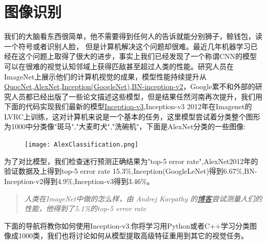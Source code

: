 \section{图像识别}
我们的大脑看东西很简单，他不需要得到任何人的告诉就能分别狮子，鲸钱包，读一个符号或者识别人脸，
但是计算机解决这个问题却很难。最近几年机器学习已经在这个问题上取得了很大的进步，事实上我们已经发现了一个称谓CNN的模型可以在很难的视觉认知邻域上获得匹敌甚至超过人类的性能。研究人员在ImageNet上展示他们的计算机视觉的成果，模型性能持续提升从\href{http://static.googleusercontent.com/media/research.google.com/en//archive/unsupervised_icml2012.pdf}{QuocNet},\href{http://www.cs.toronto.edu/~fritz/absps/imagenet.pdf}{AlexNet},\href{http://arxiv.org/abs/1409.4842}{Inception(GoogleNet)},\href{http://arxiv.org/abs/1502.03167}{BN-inception-v2}，Google累不和外部的研究人员都已经出版了一些论文描述这些模型，但是结果任然河南再次提升，我们用下面的代码实现我们最新的模型\href{http://arxiv.org/abs/1512.00567}{Inception-v3},Inception-v3 2012年在Imagenet的LVRC上训练，这对计算机来说是一个基本的任务，这里模型尝试着分类整个图形为1000中分类像"斑马","大麦町犬","洗碗机"，下面是AlexNet分类的一些图像:
\begin{center}
\begin{figure}[H]
\texttt{[image: AlexClassification.png]}
\end{figure}
\end{center}
为了对比模型，我们检查迷行预测正确结果为"top-5 error rate",AlexNet2012年的验证数据及上得到top-5 error rate 15.3\%,Inception(GoogleLeNet)得到6.67\%,BN-Inception-v2得到4.9\%,Inception-v3得到3.46\%。
\begin{quote}
\emph{人类在ImageNet中做的怎么样，由 Andrej Karpathy 的\href{http://karpathy.github.io/2014/09/02/what-i-learned-from-competing-against-a-convnet-on-imagenet/}{博客}尝试测量人们的性能，他得到了5.1\%的top-5 error rate}
\end{quote}
下面的导航将教你如何使用Inception-v3.你将学习用Python或者C++学习分类图像成1000类，我们也将讨论如何从模型提取高级特征重用到其它的视觉任务。
